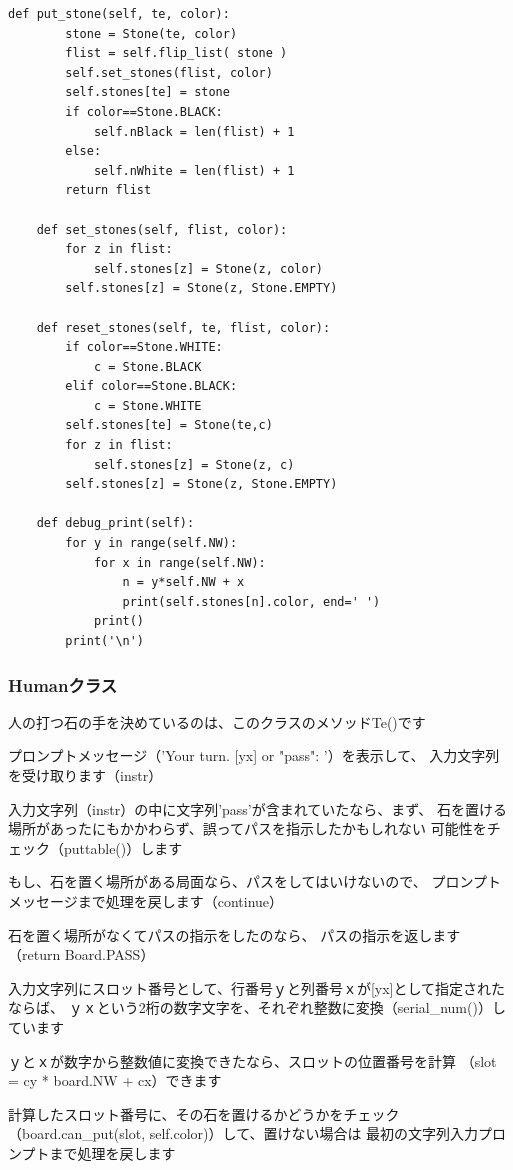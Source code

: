 \documentclass[uplatex,a4paper,11pt,oneside,openany]{jsbook}
\begin{document}
\begin{lstlisting}[caption=Board class,label=othello05]
    def put_stone(self, te, color):
        stone = Stone(te, color)
        flist = self.flip_list( stone )
        self.set_stones(flist, color)
        self.stones[te] = stone
        if color==Stone.BLACK:
            self.nBlack = len(flist) + 1
        else:
            self.nWhite = len(flist) + 1
        return flist

    def set_stones(self, flist, color):
        for z in flist:
            self.stones[z] = Stone(z, color)
        self.stones[z] = Stone(z, Stone.EMPTY)

    def reset_stones(self, te, flist, color):
        if color==Stone.WHITE:
            c = Stone.BLACK
        elif color==Stone.BLACK:
            c = Stone.WHITE
        self.stones[te] = Stone(te,c)
        for z in flist:
            self.stones[z] = Stone(z, c)
        self.stones[z] = Stone(z, Stone.EMPTY)

    def debug_print(self):
        for y in range(self.NW):
            for x in range(self.NW):
                n = y*self.NW + x
                print(self.stones[n].color, end=' ')
            print()
        print('\n')
\end{lstlisting}

\subsubsection{Humanクラス}

人の打つ石の手を決めているのは、このクラスのメソッドTe()です

プロンプトメッセージ（'Your turn. [yx] or "pass": '）を表示して、
入力文字列を受け取ります（instr）

入力文字列（instr）の中に文字列'pass'が含まれていたなら、まず、
石を置ける場所があったにもかかわらず、誤ってパスを指示したかもしれない
可能性をチェック（puttable()）します

もし、石を置く場所がある局面なら、パスをしてはいけないので、
プロンプトメッセージまで処理を戻します（continue）

石を置く場所がなくてパスの指示をしたのなら、
パスの指示を返します（return Board.PASS）

入力文字列にスロット番号として、行番号ｙと列番号ｘが[yx]として指定されたならば、
ｙｘという2桁の数字文字を、それぞれ整数に変換（serial\_num()）しています

ｙとｘが数字から整数値に変換できたなら、スロットの位置番号を計算
（slot = cy * board.NW + cx）できます

計算したスロット番号に、その石を置けるかどうかをチェック
（board.can\_put(slot, self.color)）して、置けない場合は
最初の文字列入力プロンプトまで処理を戻します
\end{document}
